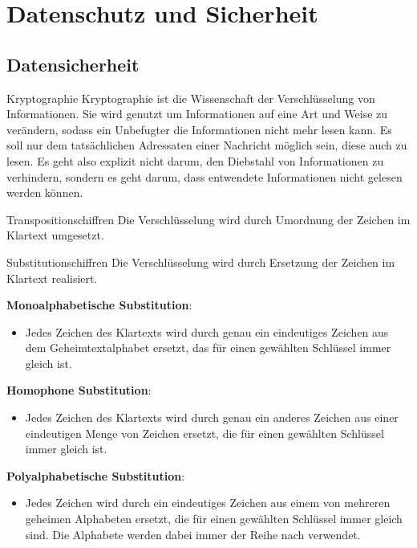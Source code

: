 
\section{Datenschutz und Sicherheit}
\subsection{Datensicherheit}

\begin{defi}{Kryptographie}
    Kryptographie ist die Wissenschaft der Verschlüsselung von Informationen. Sie wird genutzt
    um Informationen auf eine Art und Weise zu verändern, sodass ein Unbefugter
    die Informationen nicht mehr lesen kann. Es soll nur dem tatsächlichen Adressaten
    einer Nachricht möglich sein, diese auch zu lesen. Es geht also explizit nicht darum,
    den Diebstahl von Informationen zu verhindern, sondern es geht darum, dass
    entwendete Informationen nicht gelesen werden können.
\end{defi}

\begin{defi}{Transpositionschiffren}
    Die Verschlüsselung wird durch Umordnung der Zeichen
    im Klartext umgesetzt.
\end{defi}

\begin{defi}{Substitutionschiffren}
    Die Verschlüsselung wird durch Ersetzung der Zeichen
    im Klartext realisiert.

    \textbf{Monoalphabetische Substitution}:
    \begin{itemize}
        \item Jedes Zeichen des Klartexts wird durch genau
              ein eindeutiges Zeichen aus dem Geheimtextalphabet ersetzt, das für einen
              gewählten Schlüssel immer gleich ist.
    \end{itemize}

    \textbf{Homophone Substitution}:
    \begin{itemize}
        \item Jedes Zeichen des Klartexts wird durch genau ein
              anderes Zeichen aus einer eindeutigen Menge von Zeichen ersetzt, die für einen
              gewählten Schlüssel immer gleich ist.
    \end{itemize}

    \textbf{Polyalphabetische Substitution}:
    \begin{itemize}
        \item Jedes Zeichen wird durch ein eindeutiges Zeichen
              aus einem von mehreren geheimen Alphabeten ersetzt, die für einen gewählten
              Schlüssel immer gleich sind. Die Alphabete werden dabei immer der Reihe nach
              verwendet.
    \end{itemize}
\end{defi}

